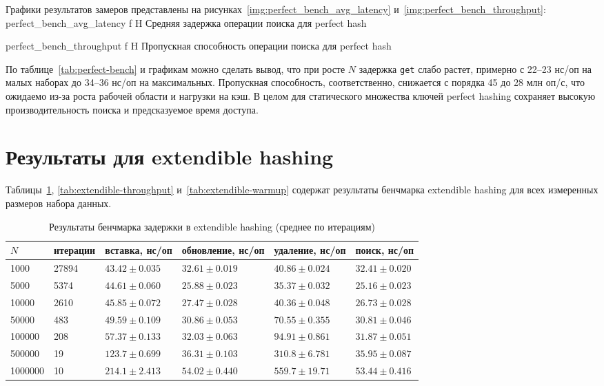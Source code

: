 \documentclass{itmo}
\begin{document}
Графики результатов замеров представлены на рисунках~\ref{img:perfect_bench_avg_latency} и~\ref{img:perfect_bench_throughput}:
	{perfect_bench_avg_latency}
	{f}
	{H}
	{\textwidth}
	{Средняя задержка операции поиска для perfect hash}

	{perfect_bench_throughput}
	{f}
	{H}
	{\textwidth}
	{Пропускная способность операции поиска для perfect hash}

По таблице~\ref{tab:perfect-bench} и графикам можно сделать вывод, что при росте $N$ задержка \texttt{get} слабо растет, примерно с 22--23 нс/оп на малых наборах до 34--36 нс/оп на максимальных.
Пропускная способность, соответственно, снижается с порядка 45 до 28 млн оп/с, что ожидаемо из-за роста рабочей области и нагрузки на кэш.
В целом для статического множества ключей perfect hashing сохраняет высокую производительность поиска и предсказуемое время доступа.

\section{Результаты для extendible hashing}

Таблицы~\ref{tab:extendible-latency}, \ref{tab:extendible-throughput} и~\ref{tab:extendible-warmup} содержат результаты бенчмарка extendible hashing для всех измеренных размеров набора данных.
\begin{table}[H]
	\centering
	\caption{Результаты бенчмарка задержки в extendible hashing (среднее по итерациям)}
	\label{tab:extendible-latency}
	\begin{tabularx}{\textwidth}{|l|l|X|X|X|X|}
		\toprule
		$N$ & итерации & вставка, нс/оп & обновление, нс/оп & удаление, нс/оп & поиск, нс/оп \\
		\midrule
		1000 & 27894 & $43.42 \pm 0.035$ & $32.61 \pm 0.019$ & $40.86 \pm 0.024$ & $32.41 \pm 0.020$ \\
		5000 & 5374 & $44.61 \pm 0.060$ & $25.88 \pm 0.023$ & $35.37 \pm 0.032$ & $25.16 \pm 0.023$ \\
		10000 & 2610 & $45.85 \pm 0.072$ & $27.47 \pm 0.028$ & $40.36 \pm 0.048$ & $26.73 \pm 0.028$ \\
		50000 & 483 & $49.59 \pm 0.109$ & $30.86 \pm 0.053$ & $70.55 \pm 0.355$ & $30.81 \pm 0.046$ \\
		100000 & 208 & $57.37 \pm 0.133$ & $32.03 \pm 0.063$ & $94.91 \pm 0.861$ & $31.87 \pm 0.051$ \\
		500000 & 19 & $123.7 \pm 0.699$ & $36.31 \pm 0.103$ & $310.8 \pm 6.781$ & $35.95 \pm 0.087$ \\
		1000000 & 10 & $214.1 \pm 2.413$ & $54.02 \pm 0.440$ & $559.7 \pm 19.71$ & $53.44 \pm 0.416$ \\
		\bottomrule
	\end{tabularx}
\end{table}
\end{document}
